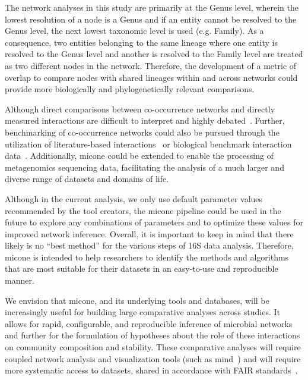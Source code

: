   The network analyses in this study are primarily at the Genus level, wherein the lowest resolution of a node is a Genus and if an entity cannot be resolved to the Genus level, the next lowest taxonomic level is used (e.g. Family).
  As a consequence, two entities belonging to the same lineage where one entity is resolved to the Genus level and another is resolved to the Family level are treated as two different nodes in the network.
  Therefore, the development of a metric of overlap to compare nodes with shared lineages within and across networks could provide more biologically and phylogenetically relevant comparisons.

  Although direct comparisons between co-occurrence networks and directly measured interactions are difficult to interpret and highly debated~\cite{hiranoDifficultyInferringMicrobial2019,gobernaCautionaryNotesUse2022}.
  Further, benchmarking of co-occurrence networks could also be pursued through the utilization of literature-based interactions~\cite{lima-mendezDeterminantsCommunityStructure2015a} or biological benchmark interaction data~\cite{sungGlobalMetabolicInteraction2017a}.
  Additionally, \ac{micone} could be extended to enable the processing of metagenomics sequencing data, facilitating the analysis of a much larger and diverse range of datasets and domains of life.

  Although in the current analysis, we only use default parameter values recommended by the tool creators, the \ac{micone} pipeline could be used in the future to explore any combinations of parameters and to optimize these values for improved network inference.
  Overall, it is important to keep in mind that there likely is no ``best method'' for the various steps of 16S data analysis.
  Therefore, \ac{micone} is intended to help researchers to identify the methods and algorithms that are most suitable for their datasets in an easy-to-use and reproducible manner.

  We envision that \ac{micone}, and its underlying tools and databases, will be increasingly useful for building large comparative analyses across studies.
  It allows for rapid, configurable, and reproducible inference of microbial networks and further for the formulation of hypotheses about the role of these interactions on community composition and stability.
  These comparative analyses will require coupled network analysis and visualization tools (such as \ac{mind}~\cite{huResourceComparisonIntegration2022}) and will require more systematic access to datasets, shared in accordance with FAIR standards~\cite{pachecoFAIRRepresentationsMicrobial2022}.
